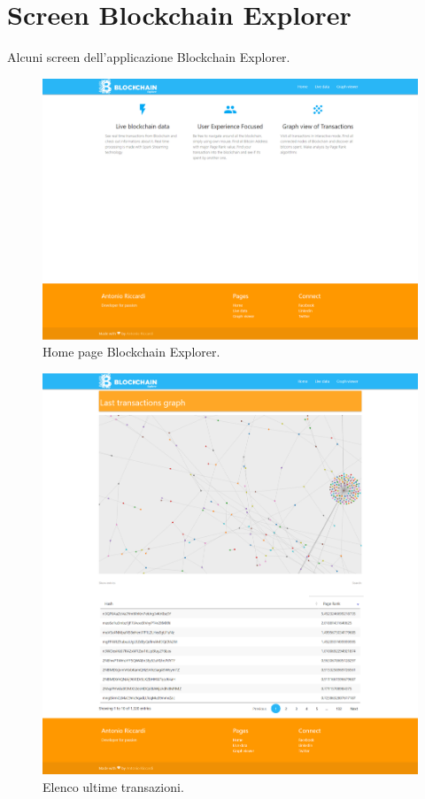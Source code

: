 \chapter{Screen Blockchain Explorer}
\label{app:a}
Alcuni screen dell'applicazione Blockchain Explorer.

\begin{figure}[H]
	\centering
	\includegraphics[width=\textwidth, height=0.60\textheight]{images/homePage.png}
	\caption{Home page Blockchain Explorer.}
	\label{fig:homeBE}
\end{figure}

\begin{figure}[H]
	\centering
	\includegraphics[width=\textwidth, height=0.80\textheight]{images/graphView.png}
	\caption{Elenco ultime transazioni.}
	\label{fig:transactionsBE}
\end{figure}


